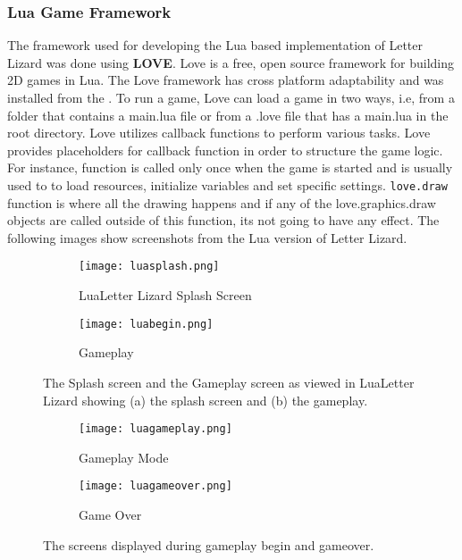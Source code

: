 \subsubsection{Lua Game Framework}
The framework used for developing the Lua based implementation of Letter Lizard was done using \textbf{LOVE}. Love is a free, open source framework for building 2D games in Lua. The Love framework has cross platform adaptability and was installed from the \cite{love}. To run a game, Love can load a game in two ways, i.e, from a folder that contains a main.lua file or from a .love file that has a main.lua in the root directory. Love utilizes callback functions to perform various tasks. Love provides placeholders for callback function in order to structure the game logic. For instance,  function is called only once when the game is started and is usually used to to load resources, initialize variables and set specific settings. \texttt{love.draw} function is where all the drawing happens and if any of the love.graphics.draw objects are called outside of this function, its not going to have any effect. The following images show screenshots from the Lua version of Letter Lizard.


\begin{figure}
    \centering
    \begin{subfigure}{0.49\textwidth}
        \texttt{[image: luasplash.png]}
        \caption{LuaLetter Lizard Splash Screen}
        \label{mainscreenmockup}
    \end{subfigure}
    \begin{subfigure}{0.49\textwidth}
        \texttt{[image: luabegin.png]}
        \caption{Gameplay}
        \label{gameplaymockup}
    \end{subfigure}
    \caption{The Splash screen and the Gameplay screen as viewed in LuaLetter Lizard
    showing (a) the splash screen and (b) the gameplay.}
    \label{screenshots}
\end{figure}

\begin{figure}
    \centering
    \begin{subfigure}{0.49\textwidth}
        \texttt{[image: luagameplay.png]}
        \caption{Gameplay Mode}
        \label{mainscreenmockup}
    \end{subfigure}
    \begin{subfigure}{0.49\textwidth}
        \texttt{[image: luagameover.png]}
        \caption{Game Over}
        \label{gameplaymockup}
    \end{subfigure}
    \caption{The screens displayed during gameplay begin and gameover.}
    \label{screenshots}
\end{figure}


